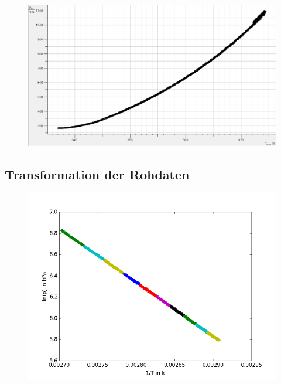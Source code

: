 \documentclass[11pt]{beamer}
\begin{document}
\begin{frame}
\begin{figure}[H]
\centering
\includegraphics[scale=0.4]{Bilder/RohdatenHaupmessungGrp2.png}
\end{figure}
\end{frame}

\subsection{Transformation der Rohdaten}
\begin{frame}
\begin{figure}[H]
\centering
\includegraphics[scale=0.5]{Bilder/linreg_EL_neuerFehler.png}
\end{figure}
\end{frame}
\end{document}
